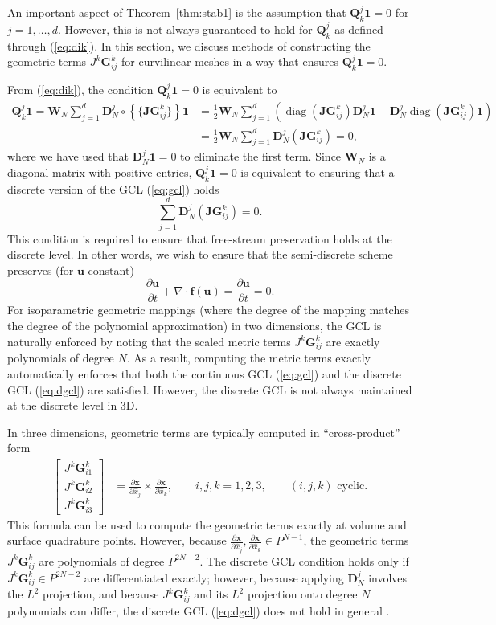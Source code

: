 \documentclass[preprint,10pt]{article}
\theoremstyle{definition}
\theoremstyle{lemma}
\theoremstyle{theorem}
\theoremstyle{assumption}
\DeclareMathOperator{\diag}{diag}
\renewcommand{\hat}{\widehat}
\newcommand{\pd}[2]{\frac{\partial#1}{\partial#2}}
\newcommand{\LRp}[1]{\left( #1 \right)}
\newcommand{\LRs}[1]{\left[ #1 \right]}
\newcommand{\LRc}[1]{\left\{ #1 \right\}}
\newcommand{\avg}[1] {\ensuremath{\LRc{\!\{#1\}\!}}}
\newcommand{\Grad} {\ensuremath{\nabla}}
\begin{document}
{An important aspect of Theorem~\ref{thm:stab1} is the assumption that $\bm{Q}^j_k\bm{1} = 0$ for $j = 1,\ldots,d$.  However, this is not always guaranteed to hold for $\bm{Q}^j_k$ as defined through (\ref{eq:dik}).  In this section, we discuss methods of constructing the geometric terms $J^k\bm{G}^k_{ij}$ for curvilinear meshes in a way that ensures $\bm{Q}^j_k\bm{1} = 0$.  

From (\ref{eq:dik}), the condition $\bm{Q}^j_k\bm{1} = 0$ is equivalent to
\begin{align*}
\bm{Q}^j_k\bm{1} = \bm{W}_N\sum_{j=1}^d\bm{D}^j_N\circ \avg{\bm{JG}_{ij}^k}\bm{1} &= \frac{1}{2}\bm{W}_N\sum_{j=1}^d \LRp{ \diag\LRp{\bm{JG}_{ij}^k}\bm{D}^j_N \bm{1} + \bm{D}^j_N\diag\LRp{\bm{JG}_{ij}^k}\bm{1}} \\
&= \frac{1}{2}\bm{W}_N\sum_{j=1}^d \bm{D}^j_N\LRp{\bm{JG}_{ij}^k} = 0,
\end{align*}
where we have used that $\bm{D}^j_N \bm{1} = 0$ to eliminate the first term.  Since $\bm{W}_N$ is a diagonal matrix with positive entries, $\bm{Q}^j_k\bm{1} = 0$ is equivalent to ensuring that a discrete version of the GCL (\ref{eq:gcl}) holds
\begin{equation}
\sum_{j=1}^d \bm{D}^j_N\LRp{\bm{JG}_{ij}^k} = 0.
\label{eq:dgcl}
\end{equation}
This condition is required to ensure that free-stream preservation holds at the discrete level.  In other words, we wish to ensure that the semi-discrete scheme preserves (for $\bm{u}$ constant) 
\[
\pd{\bm{u}}{t} + \Grad \cdot \bm{f}(\bm{u}) = \pd{\bm{u}}{t} = 0.
\]
For isoparametric geometric mappings (where the degree of the mapping matches the degree of the polynomial approximation) in two dimensions, the GCL is naturally enforced by noting that the scaled metric terms $J^k\bm{G}^k_{ij}$ are exactly polynomials of degree $N$.  As a result, computing the metric terms exactly automatically enforces that both the continuous GCL (\ref{eq:gcl}) and the discrete GCL (\ref{eq:dgcl}) are satisfied.  However, the discrete GCL is not always maintained at the discrete level in 3D.  

In three dimensions, geometric terms are typically computed in ``cross-product'' form
\begin{align}
\LRs{\begin{array}{c}
J^k\bm{G}^k_{i1}\\
J^k\bm{G}^k_{i2}\\
J^k\bm{G}^k_{i3}\end{array}} &= \pd{\bm{x}}{\hat{x}_j}\times \pd{\bm{x}}{\hat{x}_k}, \qquad i,j,k = 1,2,3, \qquad (i,j,k) \text{ cyclic}.
\end{align}
This formula can be used to compute the geometric terms exactly at volume and surface quadrature points.  However, because $\pd{\bm{x}}{\hat{x}_j},\pd{\bm{x}}{\hat{x}_k} \in P^{N-1}$, the geometric terms $J^k\bm{G}^k_{ij}$ are polynomials of degree $P^{2N-2}$.  The discrete GCL condition holds only if $J^k\bm{G}^k_{ij} \in P^{2N-2}$ are differentiated exactly; however, because applying $\bm{D}^j_N$ involves the $L^2$ projection, and because $J^k\bm{G}^k_{ij}$ and its $L^2$ projection onto degree $N$ polynomials can differ, the discrete GCL (\ref{eq:dgcl}) does not hold in general \cite{kopriva2006metric}.  

}
\end{document}

